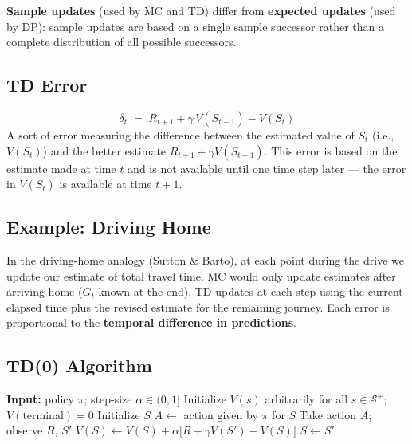 \documentclass[11pt,a4paper]{article}
\theoremstyle{definition}
\theoremstyle{plain}
\theoremstyle{remark}
\begin{document}
\textbf{Sample updates} (used by MC and TD) differ from \textbf{expected updates} (used by DP): sample updates are based on a single sample successor rather than a complete distribution of all possible successors.

\subsection{TD Error}

\begin{tcolorbox}[colback=blue!5!white, colframe=blue!60!black, title={TD Error}]
\[
    \delta_t \;=\; R_{t+1} + \gamma\, V(S_{t+1}) - V(S_t)
\]
A sort of error measuring the difference between the estimated value of $S_t$ (i.e., $V(S_t)$) and the better estimate $R_{t+1} + \gamma V(S_{t+1})$. This error is based on the estimate made at time $t$ and is not available until one time step later — the error in $V(S_t)$ is available at time $t+1$.
\end{tcolorbox}

\subsection{Example: Driving Home}

In the driving-home analogy (Sutton \& Barto), at each point during the drive we update our estimate of total travel time. MC would only update estimates after arriving home ($G_t$ known at the end). TD updates at each step using the current elapsed time plus the revised estimate for the remaining journey. Each error is proportional to the \textbf{temporal difference in predictions}.

\subsection{TD(0) Algorithm}

\begin{algorithm}
\caption{Tabular TD(0), estimating $V \approx v_\pi$}
\begin{algorithmic}
\STATE \textbf{Input:} policy $\pi$; step-size $\alpha \in (0,1]$
\STATE Initialize $V(s)$ arbitrarily for all $s \in \mathcal{S}^+$; $V(\text{terminal}) = 0$
    \STATE Initialize $S$
    \REPEAT
        \STATE $A \leftarrow$ action given by $\pi$ for $S$
        \STATE Take action $A$; observe $R$, $S'$
        \STATE $V(S) \leftarrow V(S) + \alpha\bigl[R + \gamma V(S') - V(S)\bigr]$
        \STATE $S \leftarrow S'$
\ENDFOR
\end{algorithmic}
\end{algorithm}
\end{document}
